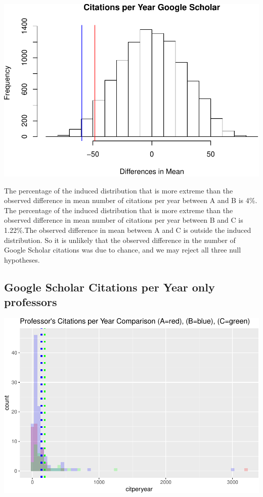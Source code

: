 \documentclass[]{article}
\begin{document}
\includegraphics{final_files/figure-latex/unnamed-chunk-68-1.pdf}

The percentage of the induced distribution that is more extreme than the
observed difference in mean number of citations per year between A and B
is 4\%. The percentage of the induced distribution that is more extreme
than the observed difference in mean number of citations per year
between B and C is 1.22\%.The observed difference in mean between A and
C is outside the induced distribution. So it is unlikely that the
observed difference in the number of Google Scholar citations was due to
chance, and we may reject all three null hypotheses.

\hypertarget{google-scholar-citations-per-year-only-professors}{%
\subsection{Google Scholar Citations per Year only
professors}\label{google-scholar-citations-per-year-only-professors}}

\includegraphics{final_files/figure-latex/unnamed-chunk-70-1.pdf}
\end{document}
